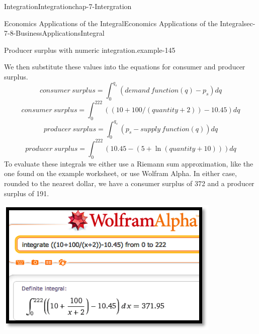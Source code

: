 \documentclass[oneside,10pt,]{book}
\numberwithin{equation}{section}
\begin{document}
\begin{chapterptx}{Integration}{}{Integration}{}{}{chap-7-Intergration}
\begin{sectionptx}{Economics Applications of the Integral}{}{Economics Applications of the Integral}{}{}{sec-7-8-BusinessApplicationsIntegral}
\begin{example}{Producer surplus with numeric integration.}{example-145}
\par
\hypertarget{p-3096}{}%
We then substitute these values into the equations for consumer and producer surplus.%
%
\begin{equation*}
consumer\ surplus= \int_0^{q_s} (demand\ function(q)- p_s )  dq
\end{equation*}
%
\begin{equation*}
consumer\ surplus= \int_0^{222} ((10+100/(quantity+2))- 10.45)  dq
\end{equation*}
%
\begin{equation*}
producer\ surplus=\int_0^{q_s} ( p_s-supply\ function(q))  dq
\end{equation*}
%
\begin{equation*}
producer\ surplus=\int_0^{222} ( 10.45-(5+\ln (quantity+10)))  dq
\end{equation*}
\hypertarget{p-3097}{}%
To evaluate these integrals we either use a Riemann sum approximation, like the one found on the example worksheet, or use Wolfram Alpha.  In either case, rounded to the nearest dollar, we have a consumer surplus of \textdollar{}372 and a producer surplus of \textdollar{}191.%
\begin{sidebyside}{1}{0.3}{0.3}{0}%
\begin{sbspanel}{0.4}%
\includegraphics[width=1\linewidth]{images/sec7-8-6.png}
\end{sbspanel}%
\end{sidebyside}%
\begin{sidebyside}{1}{0.3}{0.3}{0}%
\begin{sbspanel}{0.4}%

\end{sbspanel}
\end{sidebyside}
\end{example}
\end{sectionptx}
\end{chapterptx}
\end{document}

